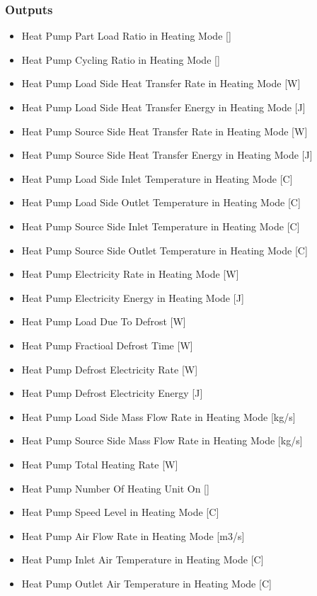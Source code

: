 \subsubsection{Outputs}\label{outputs-heatpump-air-to-water}
\begin{itemize}
\item Heat Pump Part Load Ratio in Heating Mode {[}{]}
\item Heat Pump Cycling Ratio in Heating Mode {[}{]}
\item Heat Pump Load Side Heat Transfer Rate in Heating Mode {[}W{]}
\item Heat Pump Load Side Heat Transfer Energy in Heating Mode {[}J{]}
\item Heat Pump Source Side Heat Transfer Rate in Heating Mode {[}W{]}
\item Heat Pump Source Side Heat Transfer Energy in Heating Mode {[}J{]}
\item Heat Pump Load Side Inlet Temperature in Heating Mode {[}C{]}
\item Heat Pump Load Side Outlet Temperature in Heating Mode {[}C{]}
\item Heat Pump Source Side Inlet Temperature in Heating Mode {[}C{]}
\item Heat Pump Source Side Outlet Temperature in Heating Mode {[}C{]}
\item Heat Pump Electricity Rate in Heating Mode {[}W{]}
\item Heat Pump Electricity Energy in Heating Mode {[}J{]}
\item Heat Pump Load Due To Defrost {[}W{]}
\item Heat Pump Fractioal Defrost Time {[}W{]}
\item Heat Pump Defrost Electricity Rate {[}W{]}
\item Heat Pump Defrost Electricity Energy {[}J{]}
\item Heat Pump Load Side Mass Flow Rate in Heating Mode {[}kg/s{]}
\item Heat Pump Source Side Mass Flow Rate in Heating Mode {[}kg/s{]}
\item Heat Pump Total Heating Rate {[}W{]}
\item Heat Pump Number Of Heating Unit On {[}{]}
\item Heat Pump Speed Level in Heating Mode {[}C{]}
\item Heat Pump Air Flow Rate in Heating Mode {[}m3/s{]}
\item Heat Pump Inlet Air Temperature in Heating Mode {[}C{]}
\item Heat Pump Outlet Air Temperature in Heating Mode {[}C{]}

\end{itemize}
